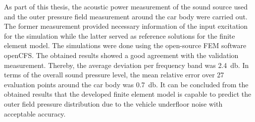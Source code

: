 As part of this thesis, the acoustic power measurement of the sound source used and the outer pressure field measurement around the car body were carried out. The former measurement provided necessary information of the input excitation for the simulation while the latter served as reference solutions for the finite element model.
The simulations were done using the open-source FEM software openCFS. The obtained results showed a good agreement with the validation measurement. Thereby, the average deviation per frequency band was \SI{2.4}{\decibel}. In terms of the overall sound pressure level, the mean relative error over 27 evaluation points around the car body was \SI{0.7}{\decibel}. It can be concluded from the obtained results that the developed finite element model is capable to predict the outer field pressure distribution due to the vehicle underfloor noise with acceptable accuracy.


